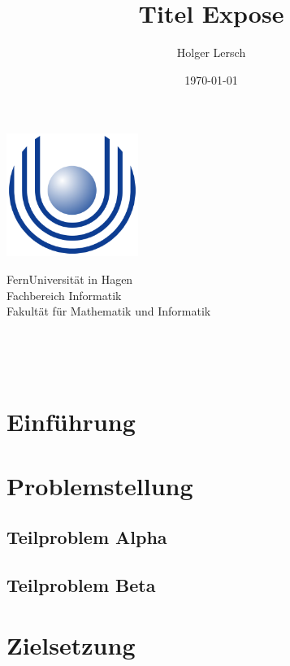 \documentclass[a4paper,oneside,11pt]{article}
\title{Titel Expose}
\author{Holger Lersch}
\date{\today}
\begin{document}
\begin{titlingpage} %
\begin{center}
\includegraphics[height=4cm]{images/Uni_hagen_logo}\\ %
\begin{large}
FernUniversit\"at in Hagen \\ %
Fachbereich Informatik\\
Fakult\"at f\"ur Mathematik und Informatik\\
\end{large}
\vspace{4cm} %
\begin{large} 
\textbf{\thetitle} \\
\end{large}
\theauthor\\
\vspace{7cm} %
\thedate
\end{center}
\end{titlingpage}

\section{Einf\"uhrung}


\section{Problemstellung}

\subsection{Teilproblem Alpha}

\subsection{Teilproblem Beta}


\section{Zielsetzung}
\end{document}
